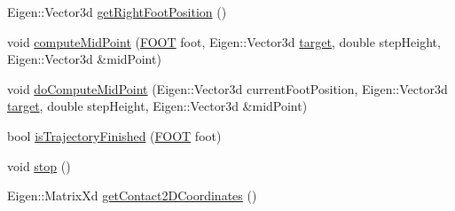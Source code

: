\begin{DoxyCompactItemize}
\item 
\-Eigen\-::\-Vector3d \hyperlink{classStepController_aaa7e389226a30582be8c8a724661a921}{get\-Right\-Foot\-Position} ()
\item 
void \hyperlink{classStepController_a0dcf2ec0d0fdf1fd9d86878fffd4e5ad}{compute\-Mid\-Point} (\hyperlink{utils_8h_a4b6a8e135f90bd56e5a57a60efb42529}{\-F\-O\-O\-T} foot, \-Eigen\-::\-Vector3d \hyperlink{classStepController_a588d5b149eb4a6877e89ecff37d0f91d}{target}, double step\-Height, \-Eigen\-::\-Vector3d \&mid\-Point)
\item 
void \hyperlink{classStepController_a16b1f62737f1287b7f33b216871d1ba8}{do\-Compute\-Mid\-Point} (\-Eigen\-::\-Vector3d current\-Foot\-Position, \-Eigen\-::\-Vector3d \hyperlink{classStepController_a588d5b149eb4a6877e89ecff37d0f91d}{target}, double step\-Height, \-Eigen\-::\-Vector3d \&mid\-Point)
\item 
bool \hyperlink{classStepController_a9e2415755548f47301277feb7a376270}{is\-Trajectory\-Finished} (\hyperlink{utils_8h_a4b6a8e135f90bd56e5a57a60efb42529}{\-F\-O\-O\-T} foot)
\item 
void \hyperlink{classStepController_a48224628b92c088a34d9db4a14f75f1a}{stop} ()
\item 
\-Eigen\-::\-Matrix\-Xd \hyperlink{classStepController_afb77002292921660ef4a44657d6566f1}{get\-Contact2\-D\-Coordinates} ()
\end{DoxyCompactItemize}
